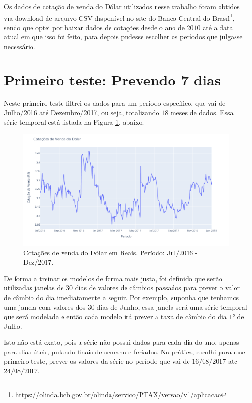 Os dados de cotação de venda do Dólar utilizados nesse trabalho foram obtidos via download de arquivo CSV disponível no site do Banco Central do Brasil\footnote{\url{https://olinda.bcb.gov.br/olinda/servico/PTAX/versao/v1/aplicacao}}, sendo que optei por baixar dados de cotações desde o ano de $2010$ até a data atual em que isso foi feito, para depois pudesse escolher os períodos que julgasse necessário.

\section{Primeiro teste: Prevendo 7 dias}

Neste primeiro teste filtrei os dados para um período específico, que vai de Julho/2016 até Dezembro/2017, ou seja, totalizando $18$ meses de dados. Essa série temporal está listada na Figura \ref{fig:serie_1}, abaixo.

\begin{figure}[htb]
\centering
\includegraphics[width=14cm]{figuras/serie_1}
\caption{Cotações de venda do Dólar em Reais. Período: Jul/2016 - Dez/2017.}
\label{fig:serie_1}
\end{figure}

De forma a treinar os modelos de forma mais justa, foi definido que serão utilizadas janelas de $30$ dias de valores de câmbios passados para prever o valor de câmbio do dia imediatamente a seguir. Por exemplo, suponha que tenhamos uma janela com valores dos $30$ dias de Junho, essa janela será uma série temporal que será modelada e então cada modelo irá prever a taxa de câmbio do dia $1$° de Julho.

Isto não está exato, pois a série não possui dados para cada dia do ano, apenas para dias úteis, pulando finais de semana e feriados. Na prática, escolhi para esse primeiro teste, prever os valores da série no período que vai de $16/08/2017$ até $24/08/2017$. 

